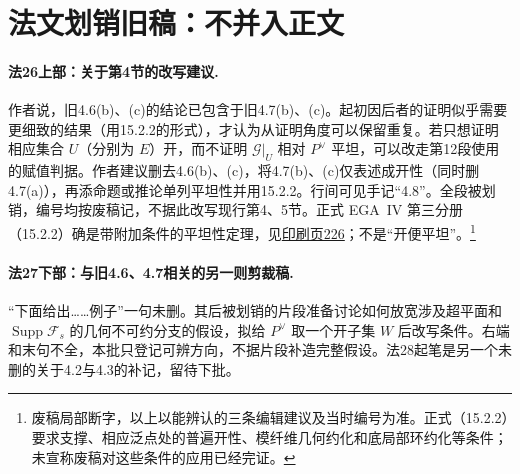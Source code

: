 \documentclass[openany,fontset=fandol]{ctexbook}
\DeclareMathOperator{\Supp}{Supp}
\newcommand{\FF}{\mathcal F}
\newcommand{\GG}{\mathcal G}
\begin{document}
\clearpage
\section*{法文划销旧稿：不并入正文}
\paragraph{法26上部：关于第4节的改写建议.}
作者说，旧4.6(b)、(c)的结论已包含于旧4.7(b)、(c)。起初因后者的证明似乎需要更细致的结果（用15.2.2的形式），才认为从证明角度可以保留重复。若只想证明相应集合 $U$（分别为 $E$）开，而不证明 $\GG|_U$ 相对 $P^\vee$ 平坦，可以改走第12段使用的赋值判据。作者建议删去4.6(b)、(c)，将4.7(b)、(c)仅表述成开性（同时删4.7(a)），再添命题或推论单列平坦性并用15.2.2。行间可见手记“4.8”。全段被划销，编号均按废稿记，不据此改写现行第4、5节。正式 EGA~IV 第三分册（15.2.2）确是带附加条件的平坦性定理，见\href{https://www.numdam.org/item/PMIHES_1966__28__5_0/}{印刷页226}；不是“开便平坦”。\footnote{废稿局部断字，以上以能辨认的三条编辑建议及当时编号为准。正式（15.2.2）要求支撑、相应泛点处的普遍开性、模纤维几何约化和底局部环约化等条件；未宣称废稿对这些条件的应用已经完证。}

\paragraph{法27下部：与旧4.6、4.7相关的另一则剪裁稿.}
“下面给出……例子”一句未删。其后被划销的片段准备讨论如何放宽涉及超平面和 $\Supp\FF_s$ 的几何不可约分支的假设，拟给 $P^\vee$ 取一个开子集 $W$ 后改写条件。右端和末句不全，本批只登记可辨方向，不据片段补造完整假设。法28起笔是另一个未删的关于4.2与4.3的补记，留待下批。
\end{document}
